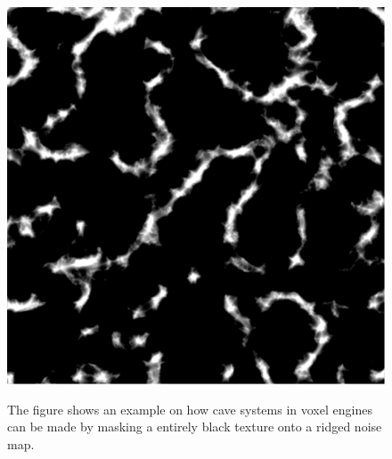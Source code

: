 \begin{figure}[H]
\begin{minipage}[b]{.32\linewidth}
		\label{fig:6b}
	\end{minipage}
	\begin{minipage}[b]{.32\linewidth}
		\includegraphics[width=0.95\linewidth]{img/Caves}
		\label{fig:6c}
	\end{minipage}
	\centering
	\caption{The figure shows an example on how cave systems in voxel engines can be made by masking a entirely black texture onto a ridged noise map.}
	\label{fig:Caves}
\end{figure}